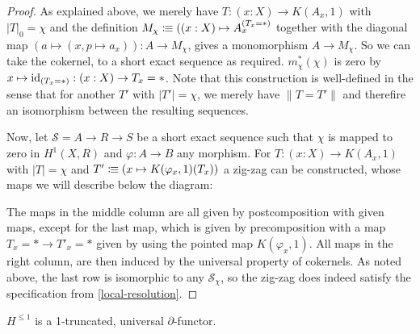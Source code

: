 \begin{proof}
  As explained above, we merely have $T:(x:X)\to K(A_x,1)$ with $|T|_0=\chi$ and the definition
  $M_\chi\vcentcolon\mspace{-1.2mu}\equiv ((x:X)\mapsto A_x^{(T_x=\ast)}$ together with the diagonal map $(a\mapsto (x, p\mapsto a_x)):A\to M_\chi$,
  gives a monomorphism $A\to M_\chi$.
  So we can take the cokernel, to a short exact sequence as required.
  $m_\chi^\ast(\chi)$ is zero by $x\mapsto \mathrm{id}_{(T_x=\ast)}:(x:X)\to T_x=\ast$.
  Note that this construction is well-defined in the sense that
  for another $T'$ with $|T'|=\chi$, we merely have $\|T=T'\|$ and therefire an isomorphism between the resulting sequences.

  Now, let $\mathcal{S}=A\to R\to S$ be a short exact sequence
  such that $\chi$ is mapped to zero in $H^1(X,R)$ and $\varphi:A\to B$ any morphism.
  For $T:(x:X)\to K(A_x,1)$ with $|T|=\chi$ and $T'\vcentcolon\mspace{-1.2mu}\equiv (x\mapsto K(\varphi_x,1)(T_x))$ 
  a zig-zag can be constructed,
  whose maps we will describe below the diagram: 
  \begin{center}
  \end{center}
  The maps in the middle column are all given by postcomposition with given maps,
  except for the last map, which is given by precomposition with a map
  $T_x=\ast\to T'_x=\ast$ given by using the pointed map $K(\varphi_x,1)$.
  All maps in the right column, are then induced by the universal property of cokernels.
  As noted above, the last row is isomorphic to any $\mathcal{S}_\chi$,
  so the zig-zag does indeed satisfy the specification from \cref{local-resolution}.
\end{proof}

\begin{theorem}
  $H^{\leq 1}$ is a 1-truncated, universal $\partial$-functor.
\end{theorem}


